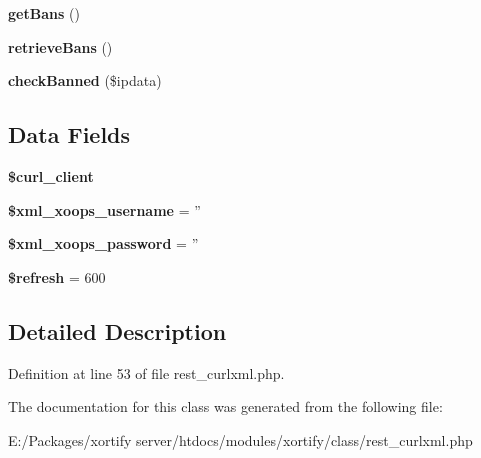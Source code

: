 \begin{DoxyCompactItemize}
\item 
\hypertarget{class_r_e_s_t___c_u_r_l_x_m_l_xortify_exchange_aea26db2906896833d32445a698fc4cdc}{{\bfseries get\-Bans} ()}\label{class_r_e_s_t___c_u_r_l_x_m_l_xortify_exchange_aea26db2906896833d32445a698fc4cdc}

\item 
\hypertarget{class_r_e_s_t___c_u_r_l_x_m_l_xortify_exchange_a4af29af927aae9aada97ef0c2cd08fa1}{{\bfseries retrieve\-Bans} ()}\label{class_r_e_s_t___c_u_r_l_x_m_l_xortify_exchange_a4af29af927aae9aada97ef0c2cd08fa1}

\item 
\hypertarget{class_r_e_s_t___c_u_r_l_x_m_l_xortify_exchange_ae41df0f26620b727f7f63342648f6474}{{\bfseries check\-Banned} (\$ipdata)}\label{class_r_e_s_t___c_u_r_l_x_m_l_xortify_exchange_ae41df0f26620b727f7f63342648f6474}

\end{DoxyCompactItemize}
\subsection*{Data Fields}
\begin{DoxyCompactItemize}
\item 
\hypertarget{class_r_e_s_t___c_u_r_l_x_m_l_xortify_exchange_a402f2112991f3227835af80e9df33e38}{{\bfseries \$curl\-\_\-client}}\label{class_r_e_s_t___c_u_r_l_x_m_l_xortify_exchange_a402f2112991f3227835af80e9df33e38}

\item 
\hypertarget{class_r_e_s_t___c_u_r_l_x_m_l_xortify_exchange_a725df0dd6b578e15522ed15945e5901c}{{\bfseries \$xml\-\_\-xoops\-\_\-username} = ''}\label{class_r_e_s_t___c_u_r_l_x_m_l_xortify_exchange_a725df0dd6b578e15522ed15945e5901c}

\item 
\hypertarget{class_r_e_s_t___c_u_r_l_x_m_l_xortify_exchange_a8ec2889165c837354fded1cedbd42157}{{\bfseries \$xml\-\_\-xoops\-\_\-password} = ''}\label{class_r_e_s_t___c_u_r_l_x_m_l_xortify_exchange_a8ec2889165c837354fded1cedbd42157}

\item 
\hypertarget{class_r_e_s_t___c_u_r_l_x_m_l_xortify_exchange_a8527f826b6959aaa92b0e51ee427ba1a}{{\bfseries \$refresh} = 600}\label{class_r_e_s_t___c_u_r_l_x_m_l_xortify_exchange_a8527f826b6959aaa92b0e51ee427ba1a}

\end{DoxyCompactItemize}


\subsection{Detailed Description}


Definition at line 53 of file rest\-\_\-curlxml.\-php.



The documentation for this class was generated from the following file\-:\begin{DoxyCompactItemize}
\item 
E\-:/\-Packages/xortify server/htdocs/modules/xortify/class/rest\-\_\-curlxml.\-php\end{DoxyCompactItemize}
